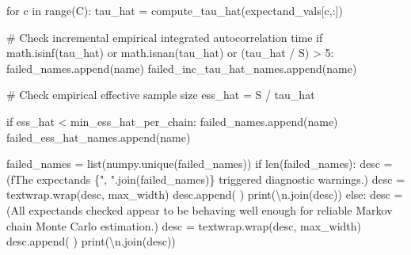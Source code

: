 \documentclass[
  letterpaper,
  DIV=11,
  numbers=noendperiod]{scrartcl}
\newenvironment{Shaded}{\begin{snugshade}}{\end{snugshade}}
\newcommand{\BuiltInTok}[1]{\textcolor[rgb]{0.00,0.23,0.31}{#1}}
\newcommand{\CharTok}[1]{\textcolor[rgb]{0.13,0.47,0.30}{#1}}
\newcommand{\CommentTok}[1]{\textcolor[rgb]{0.37,0.37,0.37}{#1}}
\newcommand{\ControlFlowTok}[1]{\textcolor[rgb]{0.00,0.23,0.31}{#1}}
\newcommand{\DecValTok}[1]{\textcolor[rgb]{0.68,0.00,0.00}{#1}}
\newcommand{\KeywordTok}[1]{\textcolor[rgb]{0.00,0.23,0.31}{#1}}
\newcommand{\NormalTok}[1]{\textcolor[rgb]{0.00,0.23,0.31}{#1}}
\newcommand{\OperatorTok}[1]{\textcolor[rgb]{0.37,0.37,0.37}{#1}}
\newcommand{\SpecialCharTok}[1]{\textcolor[rgb]{0.37,0.37,0.37}{#1}}
\newcommand{\SpecialStringTok}[1]{\textcolor[rgb]{0.13,0.47,0.30}{#1}}
\newcommand{\StringTok}[1]{\textcolor[rgb]{0.13,0.47,0.30}{#1}}
\begin{document}
\begin{Shaded}
\begin{Highlighting}[]
    \ControlFlowTok{for}\NormalTok{ c }\KeywordTok{in} \BuiltInTok{range}\NormalTok{(C):}
\NormalTok{      tau\_hat }\OperatorTok{=}\NormalTok{ compute\_tau\_hat(expectand\_vals[c,:])}

      \CommentTok{\# Check incremental empirical integrated autocorrelation time}
      \ControlFlowTok{if}\NormalTok{ math.isinf(tau\_hat) }\KeywordTok{or}\NormalTok{ math.isnan(tau\_hat) }\KeywordTok{or}\NormalTok{ (tau\_hat }\OperatorTok{/}\NormalTok{ S) }\OperatorTok{\textgreater{}} \DecValTok{5}\NormalTok{:}
\NormalTok{        failed\_names.append(name)}
\NormalTok{        failed\_inc\_tau\_hat\_names.append(name)}

      \CommentTok{\# Check empirical effective sample size}
\NormalTok{      ess\_hat }\OperatorTok{=}\NormalTok{ S }\OperatorTok{/}\NormalTok{ tau\_hat}
      
      \ControlFlowTok{if}\NormalTok{ ess\_hat }\OperatorTok{\textless{}}\NormalTok{ min\_ess\_hat\_per\_chain:}
\NormalTok{        failed\_names.append(name)}
\NormalTok{        failed\_ess\_hat\_names.append(name)}
  
\NormalTok{  failed\_names }\OperatorTok{=} \BuiltInTok{list}\NormalTok{(numpy.unique(failed\_names))}
  \ControlFlowTok{if} \BuiltInTok{len}\NormalTok{(failed\_names):}
\NormalTok{    desc }\OperatorTok{=}\NormalTok{ (}\SpecialStringTok{f\textquotesingle{}The expectands }\SpecialCharTok{\{}\StringTok{", "}\SpecialCharTok{.}\NormalTok{join(failed\_names)}\SpecialCharTok{\}}\SpecialStringTok{ \textquotesingle{}}
             \StringTok{\textquotesingle{}triggered diagnostic warnings.\textquotesingle{}}\NormalTok{)}
\NormalTok{    desc }\OperatorTok{=}\NormalTok{ textwrap.wrap(desc, max\_width)}
\NormalTok{    desc.append(}\StringTok{\textquotesingle{} \textquotesingle{}}\NormalTok{)}
    \BuiltInTok{print}\NormalTok{(}\StringTok{\textquotesingle{}}\CharTok{\textbackslash{}n}\StringTok{\textquotesingle{}}\NormalTok{.join(desc))}
  \ControlFlowTok{else}\NormalTok{:}
\NormalTok{    desc }\OperatorTok{=}\NormalTok{ (}\StringTok{\textquotesingle{}All expectands checked appear to be behaving well enough \textquotesingle{}}
            \StringTok{\textquotesingle{}for reliable Markov chain Monte Carlo estimation.\textquotesingle{}}\NormalTok{)}
\NormalTok{    desc }\OperatorTok{=}\NormalTok{ textwrap.wrap(desc, max\_width)}
\NormalTok{    desc.append(}\StringTok{\textquotesingle{} \textquotesingle{}}\NormalTok{)}
    \BuiltInTok{print}\NormalTok{(}\StringTok{\textquotesingle{}}\CharTok{\textbackslash{}n}\StringTok{\textquotesingle{}}\NormalTok{.join(desc))}
  

\end{Highlighting}
\end{Shaded}
\end{document}
